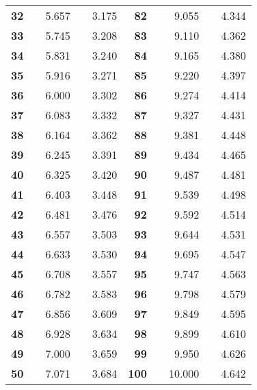 \begin{tabular}{|>{\bfseries}r|r|d{3}|r|d{3}||>{\bfseries}r|r|d{3}|r|d{3}|}
   32 &  & 5.657 &  & 3.175 &    82 &  & 9.055 &  & 4.344 \\
   33 &  & 5.745 &  & 3.208 &    83 &  & 9.110 &  & 4.362 \\
   34 &  & 5.831 &  & 3.240 &    84 &  & 9.165 &  & 4.380 \\
   35 &  & 5.916 &  & 3.271 &    85 &  & 9.220 &  & 4.397 \\
   36 &  & 6.000 &  & 3.302 &    86 &  & 9.274 &  & 4.414 \\
   37 &  & 6.083 &  & 3.332 &    87 &  & 9.327 &  & 4.431 \\
   38 &  & 6.164 &  & 3.362 &    88 &  & 9.381 &  & 4.448 \\
   39 &  & 6.245 &  & 3.391 &    89 &  & 9.434 &  & 4.465 \\
   40 &  & 6.325 &  & 3.420 &    90 &  & 9.487 &  & 4.481 \\
   41 &  & 6.403 &  & 3.448 &    91 &  & 9.539 &  & 4.498 \\
   42 &  & 6.481 &  & 3.476 &    92 &  & 9.592 &  & 4.514 \\
   43 &  & 6.557 &  & 3.503 &    93 &  & 9.644 &  & 4.531 \\
   44 &  & 6.633 &  & 3.530 &    94 &  & 9.695 &  & 4.547 \\
   45 &  & 6.708 &  & 3.557 &    95 &  & 9.747 &  & 4.563 \\
   46 &  & 6.782 &  & 3.583 &    96 &  & 9.798 &  & 4.579 \\
   47 &  & 6.856 &  & 3.609 &    97 &  & 9.849 &  & 4.595 \\
   48 &  & 6.928 &  & 3.634 &    98 &  & 9.899 &  & 4.610 \\
   49 &  & 7.000 &  & 3.659 &    99 &  & 9.950 &  & 4.626 \\
   50 &  & 7.071 &  & 3.684 &   100 &  & 10.000 &  & 4.642 \\
\hline
\end{tabular}
\endgroup

\endgroup
